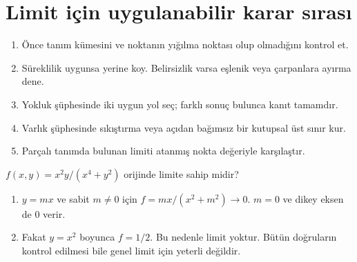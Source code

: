 \section{Limit için uygulanabilir karar sırası}
\begin{enumerate}
\item Önce tanım kümesini ve noktanın yığılma noktası olup olmadığını kontrol et.
\item Süreklilik uygunsa yerine koy. Belirsizlik varsa eşlenik veya çarpanlara ayırma dene.
\item Yokluk şüphesinde iki uygun yol seç; farklı sonuç bulunca kanıt tamamdır.
\item Varlık şüphesinde sıkıştırma veya açıdan bağımsız bir kutupsal üst sınır kur.
\item Parçalı tanımda bulunan limiti atanmış nokta değeriyle karşılaştır.
\end{enumerate}
\begin{tcolorbox}[title={Örnek 4.14 | Bütün doğruların aynı sonucu vermesi yetmez},colframe=accent]\(f(x,y)=x^2y/(x^4+y^2)\) orijinde limite sahip midir?
\par\vspace{1mm}{\scriptsize\sffamily Pekiştirme}\end{tcolorbox}
\begin{tcolorbox}[title={Adım adım çözüm},colback=green!3!white,colframe=green]\begin{enumerate}
\item \(y=mx\) ve sabit \(m\ne0\) için \(f=mx/(x^2+m^2)\to0\). \(m=0\) ve dikey eksen de 0 verir.
\item Fakat \(y=x^2\) boyunca \(f=1/2\). Bu nedenle limit yoktur. Bütün doğruların kontrol edilmesi bile genel limit için yeterli değildir.
\end{enumerate}\end{tcolorbox}

\clearpage
